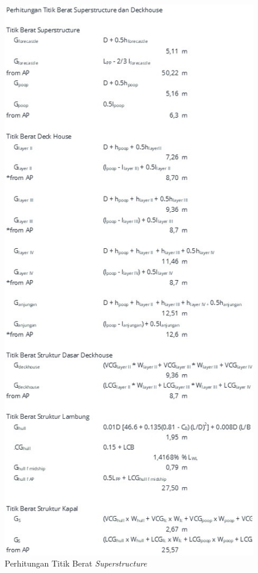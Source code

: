 \begin{figure}[!ht]
    \centering
    \includegraphics[width=\linewidth,height=\textheight,keepaspectratio]{lampiran/deskap-8.jpg}
    \caption*{Perhitungan Titik Berat \emph{Superstructure}}
\end{figure}

